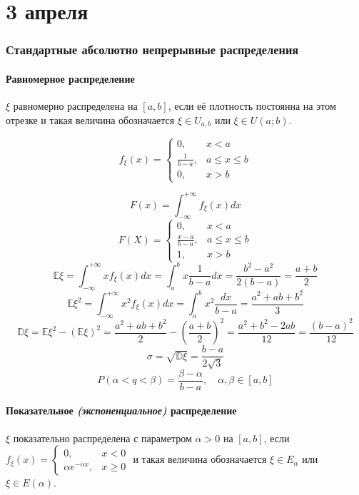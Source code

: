 \chapter{3 апреля}

\subsection{Стандартные абсолютно непрерывные распределения}

\subsubsection{Равномерное распределение}

\(\xi\) равномерно распределена на \([a, b]\), если её плотность постоянна на этом отрезке и такая величина обозначается \(\xi \in U_{a, b}\) или \(\xi \in U(a; b)\).

\[f_\xi(x) = \begin{cases} 0, & x < a \\ \frac{1}{b - a}, & a \leq x \leq b \\ 0, & x > b \end{cases} \]

\[F(x) = \int_{ -\infty}^{+\infty} f_\xi(x) dx\]
\[F(X) = \begin{cases} 0, & x < a \\ \frac{x - a}{b - a}, & a \leq x \leq b \\ 1, & x > b \end{cases} \]
\[\mathbb{E}\xi = \int_{ -\infty}^{+\infty} x f_\xi(x) dx = \int_a^b x \frac{1}{b - a}dx = \frac{b^2 - a^2}{2(b - a)} = \frac{a + b}{2} \]
\[\mathbb{E}\xi^2 = \int_{ -\infty}^{+\infty} x^2 f_\xi(x) dx = \int_a^b x^2 \frac{dx}{b - a} = \frac{a^2 + ab + b^2}{3}\]
\[\mathbb{D}\xi = \mathbb{E}\xi^2 - (\mathbb{E}\xi)^2 = \frac{a^2 + ab + b^2}{2} - \left( \frac{a + b}{2} \right)^2 = \frac{a^2 + b^2 - 2ab}{12} = \frac{(b - a)^2}{12}\]
\[\sigma = \sqrt{\mathbb{D}\xi} = \frac{b - a}{2\sqrt{3}} \]
\[P(\alpha < q < \beta) = \frac{\beta - \alpha}{b - a}, \quad \alpha, \beta \in [a, b]\]

\subsubsection{Показательное \textit{(экспоненциальное)} распределение}

\(\xi\) показательно распределена с параметром \(\alpha > 0\) на \([a, b]\), если \(f_\xi(x) = \begin{cases}
    0,                      & x < 0    \\
    \alpha e^{ - \alpha x}, & x \geq 0
\end{cases}\) и такая величина обозначается \(\xi \in E_\alpha\) или \(\xi \in E(\alpha)\).

